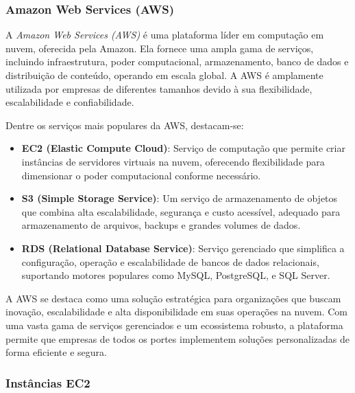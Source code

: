 \subsubsection{Amazon Web Services (AWS)}


A \emph{Amazon Web Services (AWS)} é uma plataforma líder em computação em nuvem, oferecida pela Amazon. Ela fornece uma ampla gama de serviços, incluindo infraestrutura, poder computacional, armazenamento, banco de dados e distribuição de conteúdo, operando em escala global. A AWS é amplamente utilizada por empresas de diferentes tamanhos devido à sua flexibilidade, escalabilidade e confiabilidade.

Dentre os serviços mais populares da AWS, destacam-se:

\begin{itemize}
    \item \textbf{EC2 (Elastic Compute Cloud)}: Serviço de computação que permite criar instâncias de servidores virtuais na nuvem, oferecendo flexibilidade para dimensionar o poder computacional conforme necessário.
    \item \textbf{S3 (Simple Storage Service)}: Um serviço de armazenamento de objetos que combina alta escalabilidade, segurança e custo acessível, adequado para armazenamento de arquivos, backups e grandes volumes de dados.
    \item \textbf{RDS (Relational Database Service)}: Serviço gerenciado que simplifica a configuração, operação e escalabilidade de bancos de dados relacionais, suportando motores populares como MySQL, PostgreSQL, e SQL Server.
\end{itemize}

A AWS se destaca como uma solução estratégica para organizações que buscam inovação, escalabilidade e alta disponibilidade em suas operações na nuvem. Com uma vasta gama de serviços gerenciados e um ecossistema robusto, a plataforma permite que empresas de todos os portes implementem soluções personalizadas de forma eficiente e segura.

\subsubsection{Instâncias EC2}


